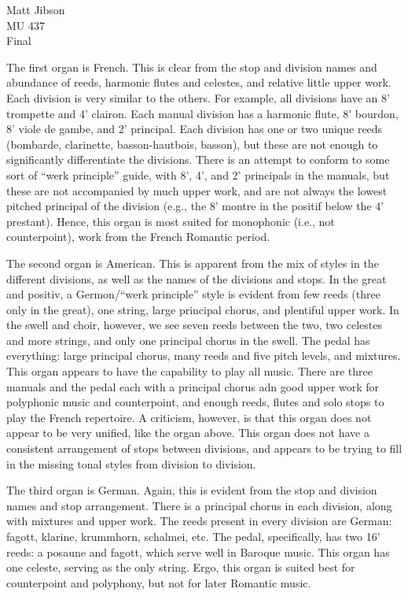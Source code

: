 \documentclass{article}
\begin{document}
\begin{flushright}
Matt Jibson \\
MU 437 \\
Final
\end{flushright}

{\setlength{\baselineskip}{1.6\baselineskip}

The first organ is French. This is clear from the stop and division names and abundance of reeds, harmonic flutes and celestes, and relative little upper work. Each division is very similar to the others. For example, all divisions have an 8' trompette and 4' clairon. Each manual division has a harmonic flute, 8' bourdon, 8' viole de gambe, and 2' principal. Each division has one or two unique reeds (bombarde, clarinette, basson-hautbois, basson), but these are not enough to significantly differentiate the divisions. There is an attempt to conform to some sort of ``werk principle'' guide, with 8', 4', and 2' principals in the manuals, but these are not accompanied by much upper work, and are not always the lowest pitched principal of the division (e.g., the 8' montre in the positif below the 4' prestant). Hence, this organ is most suited for monophonic (i.e., not counterpoint), work from the French Romantic period.

The second organ is American. This is apparent from the mix of styles in the different divisions, as well as the names of the divisions and stops. In the great and positiv, a Germon/``werk principle'' style is evident from few reeds (three only in the great), one string, large principal chorus, and plentiful upper work. In the swell and choir, however, we see seven reeds between the two, two celestes and more strings, and only one principal chorus in the swell. The pedal has everything: large principal chorus, many reeds and five pitch levels, and mixtures. This organ appears to have the capability to play all music. There are three manuals and the pedal each with a principal chorus adn good upper work for polyphonic music and counterpoint, and enough reeds, flutes and solo stops to play the French repertoire. A criticism, however, is that this organ does not appear to be very unified, like the organ above. This organ does not have a consistent arrangement of stops between divisions, and appears to be trying to fill in the missing tonal styles from division to division.

The third organ is German. Again, this is evident from the stop and division names and stop arrangement. There is a principal chorus in each division, along with mixtures and upper work. The reeds present in every division are German: fagott, klarine, krummhorn, schalmei, etc. The pedal, specifically, has two 16' reeds: a posaune and fagott, which serve well in Baroque music. This organ has one celeste, serving as the only string. Ergo, this organ is suited best for counterpoint and polyphony, but not for later Romantic music.

}
\end{document}
